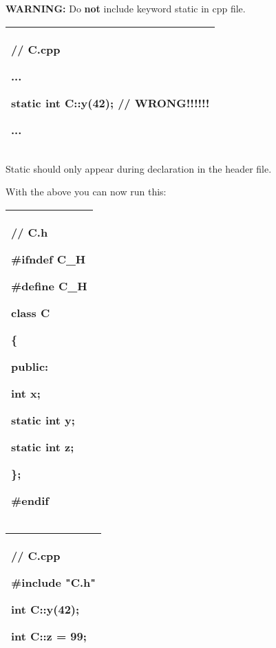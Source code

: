 \documentclass[
]{article}
\begin{document}
\textbf{WARNING:} Do \textbf{not} include keyword static in cpp file.

\begin{longtable}[]{@{}l@{}}
\toprule
\endhead
\begin{minipage}[t]{0.97\columnwidth}\raggedright
// C.cpp

...

static int C::y(42); // WRONG!!!!!!

...\strut
\end{minipage}\tabularnewline
\bottomrule
\end{longtable}

Static should only appear during declaration in the header file.

With the above you can now run this:

\begin{longtable}[]{@{}l@{}}
\toprule
\endhead
\begin{minipage}[t]{0.97\columnwidth}\raggedright
// C.h

\#ifndef C\_H

\#define C\_H

class C

\{

public:

int x;

static int y;

static int z;

\};

\#endif\strut
\end{minipage}\tabularnewline
\bottomrule
\end{longtable}

\begin{longtable}[]{@{}l@{}}
\toprule
\endhead
\begin{minipage}[t]{0.97\columnwidth}\raggedright
// C.cpp

\#include "C.h"

int C::y(42);

int C::z = 99;\strut
\end{minipage}\tabularnewline
\bottomrule
\end{longtable}
\end{document}
